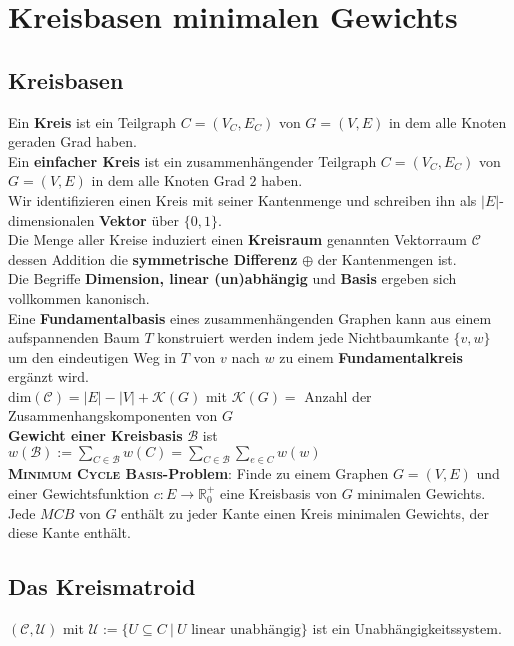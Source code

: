 \documentclass[a4paper,10pt]{scrartcl}
\newcommand{\tbf}{\textbf}
\newcommand{\tsc}{\textsc}
\newcommand{\Gr}{$G = (V,E)$ }
\newcommand{\Gwfktp}{$c: E \rightarrow \mathbb{R}_0^+$ }
\newcommand{\calB}{\mathcal{B}}
\newcommand{\calC}{\mathcal{C}}
\newcommand{\calK}{\mathcal{K}}
\newcommand{\calU}{\mathcal{U}}
\begin{document}
\newpage
\section{Kreisbasen minimalen Gewichts}
\subsection{Kreisbasen}
Ein \tbf{Kreis} ist ein Teilgraph $C = (V_C, E_C)$ von \Gr in dem alle Knoten geraden Grad haben. \\

Ein \tbf{einfacher Kreis} ist ein zusammenhängender Teilgraph $C = (V_C, E_C)$ von \Gr in dem alle Knoten Grad $2$ haben. \\

Wir identifizieren einen Kreis mit seiner Kantenmenge und schreiben ihn als $|E|$-dimensionalen \tbf{Vektor} über $\{0,1\}$. \\

Die Menge aller Kreise induziert einen \tbf{Kreisraum} genannten Vektorraum $\calC$ dessen Addition die \tbf{symmetrische Differenz} $\oplus$ der Kantenmengen ist. \\

Die Begriffe \tbf{Dimension, linear (un)abhängig} und \tbf{Basis} ergeben sich vollkommen kanonisch. \\

Eine \tbf{Fundamentalbasis} eines zusammenhängenden Graphen kann aus einem aufspannenden Baum $T$ konstruiert werden indem jede Nichtbaumkante $\{v,w\}$ um den eindeutigen Weg in $T$ von $v$ nach $w$ zu einem \tbf{Fundamentalkreis} ergänzt wird. \\

dim$(\calC) = |E| - |V| + \calK(G)$ mit $\calK(G) =$ Anzahl der Zusammenhangskomponenten von $G$ \\

\tbf{Gewicht einer Kreisbasis} $\calB$ ist $w(\calB) := \sum_{C \in \calB} \limits w(C) = \sum_{C \in \calB} \limits \sum_{e \in C} \limits w(w)$ \\

\tbf{\tsc{Minimum Cycle Basis}-Problem}: Finde zu einem Graphen \Gr und einer Gewichtsfunktion \Gwfktp eine Kreisbasis von $G$ minimalen Gewichts. \\

Jede $MCB$ von $G$ enthält zu jeder Kante einen Kreis minimalen Gewichts, der diese Kante enthält. \\

\subsection{Das Kreismatroid}
$(\calC,\calU)$ mit $\calU := \{ U \subseteq C \ | \ U \text{ linear unabhängig} \}$ ist ein Unabhängigkeitssystem.
\end{document}
